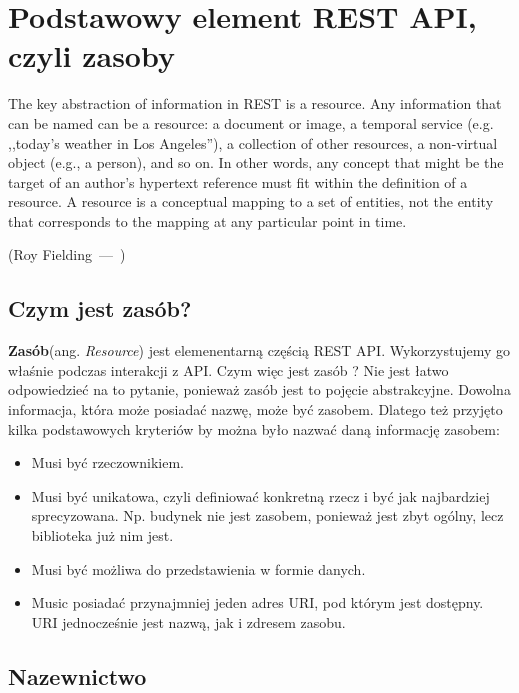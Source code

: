 \documentclass[oneside,polski,logo,indent]{amuthesis}
\let\oldquote\quote
\let\endoldquote\endquote
\renewenvironment{quote}[2][]
  {\if\relax\detokenize{#1}\relax
     \def\quoteauthor{#2}%
   \else
     \def\quoteauthor{#2~---~#1}%
   \fi
   \oldquote}
  {\par\nobreak\smallskip\hfill(\quoteauthor)%
   \endoldquote\addvspace{\bigskipamount}}
\begin{document}
\section{Podstawowy element REST API, czyli zasoby}

\begin{quote}{Roy Fielding}
The key abstraction of information in REST is a resource. Any information that can be named can be a resource: a document or image, a temporal service (e.g. ,,today’s weather in Los Angeles''), a collection of other resources, a non-virtual object (e.g., a person), and so on. In other words, any concept that might be the target of an author’s hypertext reference must fit within the definition of a resource. A resource is a conceptual mapping to a set of entities, not the entity that corresponds to the mapping at any particular point in time.
\end{quote}

\begin{center}
\subsection{Czym jest zasób?}
\end{center}

\textbf{Zasób}(ang. \emph{Resource}) jest elemenentarną częścią REST API. Wykorzystujemy go właśnie podczas interakcji z API. Czym więc jest zasób ? Nie jest łatwo odpowiedzieć na to pytanie, ponieważ zasób jest to pojęcie abstrakcyjne. Dowolna informacja, która może posiadać nazwę, może być zasobem. Dlatego też przyjęto kilka podstawowych kryteriów by można było nazwać daną informację zasobem:\newline

\begin{itemize}
\item Musi być rzeczownikiem.
\item Musi być unikatowa, czyli definiować konkretną rzecz i być jak najbardziej sprecyzowana. Np. budynek nie jest zasobem, ponieważ jest zbyt ogólny, lecz biblioteka już nim jest. 
\item Musi być możliwa do przedstawienia w formie danych.
\item Music posiadać przynajmniej jeden adres URI, pod którym jest dostępny. URI jednocześnie jest nazwą, jak i zdresem zasobu.\newline
\end{itemize}

\begin{center}
\subsection{Nazewnictwo}
\end{center}
\end{document}
